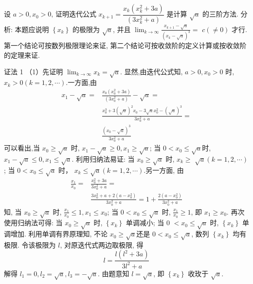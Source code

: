 \begin{tcolorbox}[enhanced,colback=8,colframe=7,breakable,coltitle=green!25!black,title=2024]

设 $ a>0, x_{0}>0 $, 证明迭代公式
$
x_{k+1}=\dfrac{x_{k}\left(x_{k}^{2}+3 a\right)}{\left(3 x_{k}^{2}+a\right)}
$
是计算 $ \sqrt{a} $ 的三阶方法.
\tcblower
分析: 本题应说明 $ \left\{x_{k}\right\} $ 的极限为 $ \sqrt{a} $, 并且 $ \lim _{k \rightarrow \infty} \frac{x_{k+1}-\sqrt{a}}{\left(x_{k}-\sqrt{a}\right)^{3}}= $ $ c(\neq 0) $ 才行.第一个结论可按数列极限理论来证, 第二个结论可按收敛阶的定义计算或按收敛阶的定理来证.

证法 1\;  （1）先证明 $ \lim _{k \rightarrow \infty} x_{k}=\sqrt{a} $.
显然,由迭代公式知, $ a>0, x_{0}>0 $ 时, $ x_{k}>0(k=1,2, \cdots) $.一方面,由
$$
\begin{aligned}
x_{1}-\sqrt{a}= & \frac{x_{0}\left(x_{0}^{2}+3 a\right)}{\left(3 x_{0}^{2}+a\right)}-\sqrt{a}= \\
& \frac{x_{0}^{3}+3(\sqrt{a})^{2} x_{0}-3 \sqrt{a} x_{0}^{2}-(\sqrt{a})^{3}}{3 x_{0}^{2}+a}= \\
& \frac{\left(x_{0}-\sqrt{a}\right)^{3}}{3 x_{0}^{2}+a}
\end{aligned}
$$
可以看出,当 $ x_{0} \geqslant \sqrt{a} $ 时, $ x_{1}-\sqrt{a} \geqslant 0, x_{1} \geqslant \sqrt{a} $; 当 $ 0<x_{0} \leqslant \sqrt{a} $时, $ x_{1}-\sqrt{a} \leqslant 0, x_{1} \leqslant \sqrt{a} $. 利用归纳法易证: 当 $ x_{0} \geqslant \sqrt{a} $ 时, $ x_{k} \geqslant $ $ \sqrt{a}(k=1,2, \cdots) $; 当 $ 0<x_{0} \leqslant \sqrt{a} $ 时， $ x_{k} \leqslant \sqrt{a}(k=1,2, \cdots) $.另一方面, 由
$$
\begin{aligned}
\frac{x_{1}}{x_{0}}= & \frac{x_{0}^{2}+3 a}{3 x_{0}^{2}+a}= \\
& \frac{3 x_{0}^{2}+a+2\left(a-x_{0}^{2}\right)}{3 x_{0}^{2}+a}=1+\frac{2\left(a-x_{0}^{2}\right)}{3 x_{0}^{2}+a}
\end{aligned}
$$
知, 当 $ x_{0} \geqslant \sqrt{a} $ 时, $ \frac{x_{1}}{x_{0}} \leqslant 1, x_{1} \leqslant x_{0} $; 当 $ 0<x_{0} \leqslant \sqrt{a} $ 时, $ \frac{x_{1}}{x_{0}} \geqslant 1 $, 即 $ x_{1} \geqslant x_{0} $. 再次使用归纳法可得: 当 $ x_{0} \geqslant \sqrt{a} $ 时, $ \left\{x_{k}\right\} $ 单调减小; 当 0 $ <x_{0} \leqslant \sqrt{a} $ 时, $ \left\{x_{k}\right\} $ 单调增加. 利用单调有界原理知, 不论 $ x_{0} \geqslant \sqrt{a} $还是 $ 0<x_{0} \leqslant \sqrt{a} $, 数列 $ \left\{x_{k}\right\} $ 均有极限. 令该极限为 $ l $, 对原迭代式两边取极限, 得
$$
l=\frac{l\left(l^{2}+3 a\right)}{3 l^{2}+a}
$$
解得 $ l_{1}=0, l_{2}=\sqrt{a}, l_{3}=-\sqrt{a} $. 由题意知 $ l=\sqrt{a} $, 即 $ \left\{x_{k}\right\} $ 收玫于 $ \sqrt{a} $.


\end{tcolorbox}
